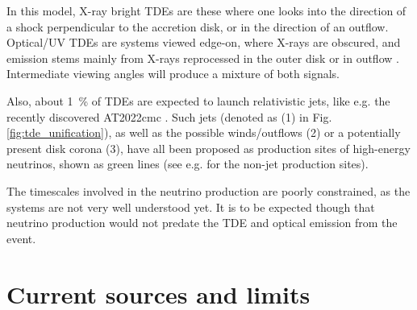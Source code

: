 \documentclass[
    a4paper, %
    fontsize=10pt, %
    twoside=false, %
    numbers=noenddot, %
    fontmethod=tex,
]{kaobook}
\begin{document}
In this model, X-ray bright TDEs are these where one looks into the direction of a shock perpendicular to the accretion disk, or in the direction of an outflow. Optical/UV TDEs are systems viewed edge-on, where X-rays are obscured, and emission stems mainly from X-rays reprocessed in the outer disk or in outflow . Intermediate viewing angles will produce a mixture of both signals.

Also, about \SI{1}{\percent} of TDEs are expected to launch relativistic jets, like e.g. the recently discovered AT2022cmc . Such jets (denoted as (1) in Fig. \ref{fig:tde_unification}), as well as the possible winds/outflows (2) or a potentially present disk corona (3), have all been proposed as production sites of high-energy neutrinos, shown as green lines (see e.g.  for the non-jet production sites).

The timescales involved in the neutrino production are poorly constrained, as the systems are not very well understood yet. It is to be expected though that neutrino production would not predate the TDE and optical emission from the event.

\section{Current sources and limits}
\end{document}
